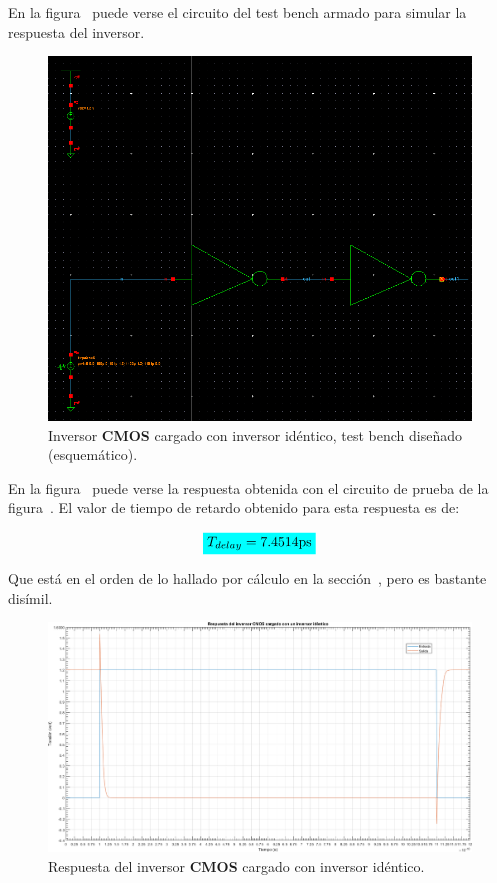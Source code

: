 En la figura~ puede verse el circuito del test bench armado para simular la respuesta del inversor.


\begin{figure}[H] %
\begin{center}
\includegraphics[width=0.85 \textwidth, angle=0]{./img/point2/TEST_LOGIC_GATES_tb_inverter_same_load_schematic}
\caption{\label{fig:fig_inverter_same_load_schematic}\footnotesize{Inversor \textbf{CMOS} cargado con inversor idéntico, test bench diseñado (esquemático).}}
\end{center}
\end{figure}


En la figura~ puede verse la respuesta obtenida con el circuito de prueba de la figura~. El valor de tiempo de retardo obtenido para esta respuesta es de:


\begin{equation*}
\mathcolorbox{Cyan}{ T_{delay} = 7.4514 \si[per-mode=symbol]{\pico\second} }
\end{equation*}

Que está en el orden de lo hallado por cálculo en la sección~, pero es bastante disímil.


\vfill


\clearpage



\begin{figure}[H] %
\begin{center}
\includegraphics[width=0.92 \textheight, angle=90]{./img/point2/same_load_response}
\caption{\label{fig:fig_inverter_same_load_response}\footnotesize{Respuesta del inversor \textbf{CMOS} cargado con inversor idéntico.}}
\end{center}
\end{figure}


\clearpage